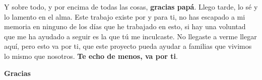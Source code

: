 {\begin{minipage}[c]{0.75\textwidth}
        \vspace*{15pt}

\quad Y sobre todo, y por encima de todas las cosas, \textbf{gracias papá}. Llego tarde, lo sé y lo lamento en el alma. Este trabajo existe por y para ti, no has escapado a mi memoria en ninguno de los días que he trabajado en esto, si hay una voluntad que me ha ayudado a seguir es la que tú me inculcaste. No llegaste a verme llegar aquí, pero esto va por ti, que este proyecto pueda ayudar a familias que vivimos lo mismo que nosotros. \textbf{Te echo de menos, va por ti}.

        \vspace*{20pt}

\hspace{\fill}\textbf{Gracias}\hspace{\fill} 

        \vspace*{\fill}
    \end{minipage}
}